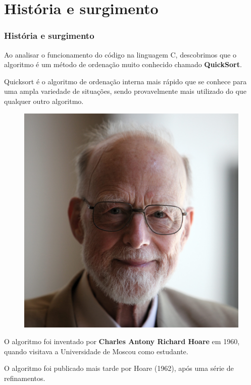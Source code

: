 \documentclass[
	11pt, %
]{beamer}
\begin{document}
\section{História e surgimento}
\begin{frame}
	\frametitle{História e surgimento}
	
	\footnotesize
	\justifying Ao analisar o funcionamento do código na linguagem C, descobrimos que o algoritmo é um método de ordenação muito conhecido chamado \textbf{QuickSort}.
	
	\bigskip
	
	\justifying Quicksort é o algoritmo de ordenação interna mais rápido que se conhece para uma ampla variedade de situações, sendo provavelmente mais utilizado do que qualquer outro algoritmo.
	
	\bigskip
	\begin{figure}
		\includegraphics[width=1\linewidth]{Sir_Tony_Hoare_IMG_5125.jpg}
	\end{figure}

	O algoritmo foi inventado por \textbf{Charles Antony Richard Hoare} em 1960, quando visitava a Universidade de Moscou como estudante.
	
	\bigskip
	O algoritmo foi publicado mais tarde por Hoare (1962), após uma série de refinamentos.
	

\end{frame}
\end{document}
